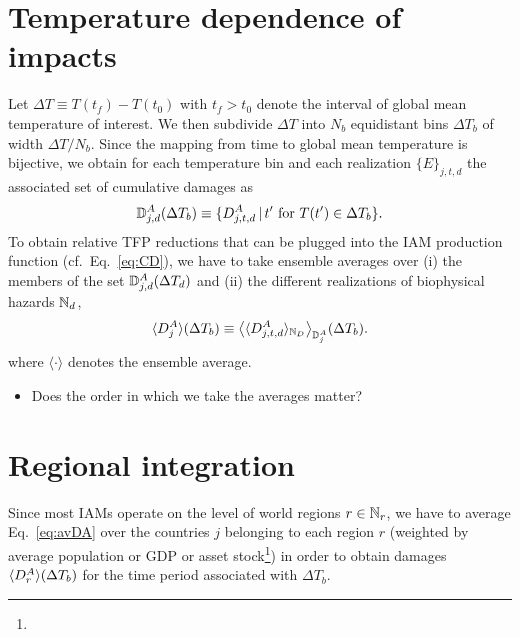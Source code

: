 \documentclass[preprint,3p,authoryear]{elsarticle}
\begin{document}

\section{Temperature dependence of impacts}
Let  $\Delta T\equiv T(t_f)-T(t_0)$ with $t_f>t_0$ denote the interval of global mean temperature of interest. We then subdivide $\Delta T$ into $N_b$ equidistant bins $\Delta T_b$ of width $\Delta T/N_b$. Since the mapping from time to global mean temperature is bijective, we obtain for each temperature bin and each realization $\lbrace E\rbrace_{j,t,d}$ the associated set of cumulative damages as
\begin{equation}
  \label{eq:DDA}
  \mathbb{D}^A_{j,d}(\Delta T_b)\equiv\lbrace D^A_{j,t,d}\, \vert\, t' \text{ for } T(t')\in\Delta T_b \rbrace.
\end{equation}
To obtain relative TFP reductions that can be plugged into the IAM production function (cf.~Eq.~\eqref{eq:CD}), we have to take ensemble averages over (i) the members of the set $\mathbb{D}^A_{j,d}(\Delta T_d)$ and (ii) the different realizations of biophysical hazards $\mathbb{N}_d$,
\begin{equation}
  \label{eq:avDA}
  \langle D^A_{j}\rangle(\Delta T_b)\equiv\big\langle\langle D^A_{j,t,d}\rangle_{\mathbb{N}_D}\big\rangle_{\mathbb{D}^A_{j}}(\Delta T_b).
\end{equation}
where $\langle\cdot\rangle$ denotes the ensemble average.

\begin{itemize}
\item Does the order in which we take the averages matter?
\end{itemize}

\section{Regional integration}
\label{sec:regInt}
Since most IAMs operate on the level of world regions $r\in\mathbb{N}_r$, we have to average Eq.~\eqref{eq:avDA} over the countries $j$ belonging to each region $r$ (weighted by average population or GDP or asset stock\footnote{})  in order to obtain damages $\langle D^A_{r}\rangle(\Delta T_b)$ for the time period associated with $\Delta T_b$.
\end{document}
